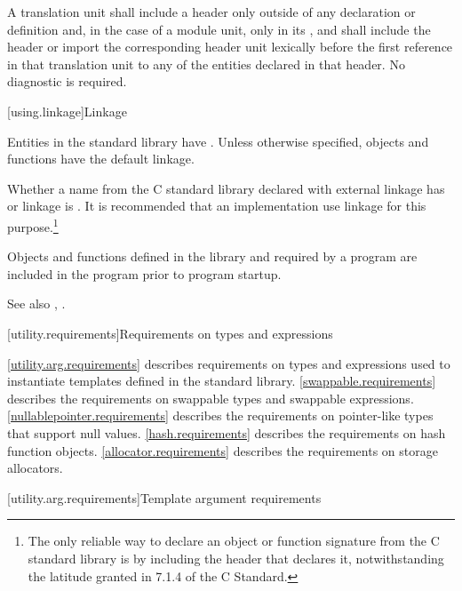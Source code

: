 \pnum
A translation unit shall include a header only outside of any
%
declaration or definition and,
in the case of a module unit,
only in its , and
shall include the header or import the corresponding header unit lexically
before the first reference in that translation unit to any of the entities
declared in that header. No diagnostic is required.

[using.linkage]{Linkage}

\pnum
Entities in the \Cpp{} standard library have .
Unless otherwise specified, objects and functions have the default
linkage.

\pnum
{}%
Whether a name from the C standard library declared with
external linkage has
%
%
%
or
%
linkage is . It is recommended that an
implementation use
linkage for this purpose.\footnote{The only reliable way to declare an object or
function signature from the C standard library is by including the header that
declares it, notwithstanding the latitude granted in 7.1.4 of the C
Standard.}

\pnum
Objects and functions
defined in the library and required by a \Cpp{} program are included in
the program prior to program startup.

%
\pnum
See also
,
.

[utility.requirements]{Requirements on types and expressions}

\pnum
\ref{utility.arg.requirements}
describes requirements on types and expressions used to instantiate templates
defined in the \Cpp{} standard library.
\ref{swappable.requirements} describes the requirements on swappable types and
swappable expressions.
\ref{nullablepointer.requirements} describes the requirements on pointer-like
types that support null values.
\ref{hash.requirements} describes the requirements on hash function objects.
\ref{allocator.requirements} describes the requirements on storage
allocators.

[utility.arg.requirements]{Template argument requirements}

